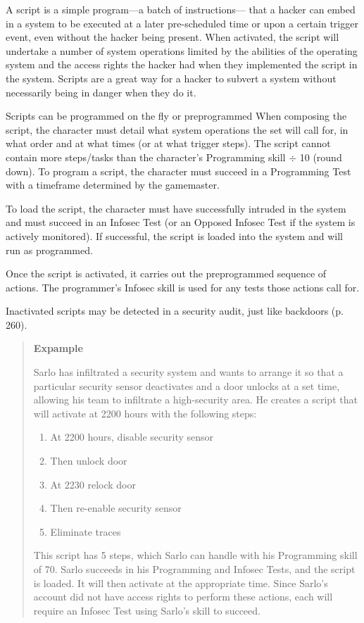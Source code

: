 A script is a simple program—a batch of instructions—
that a hacker can embed in a system to be executed at 
a later pre-scheduled time or upon a certain trigger 
event, even without the hacker being present. When 
activated, the script will undertake a number of system 
operations limited by the abilities of the operating 
system and the access rights the hacker had when 
they implemented the script in the system. Scripts are 
a great way for a hacker to subvert a system without 
necessarily being in danger when they do it.

Scripts can be programmed on the fly or preprogrammed
When composing the script, the character
must detail what system operations the set will call 
for, in what order and at what times (or at what trigger
steps). The script cannot contain more steps/tasks
than the character's Programming skill $\div$ 10 (round 
down). To program a script, the character must succeed
in a Programming Test with a timeframe determined
by the gamemaster.

To load the script, the character must have successfully
intruded in the system and must succeed
in an Infosec Test (or an Opposed Infosec Test if the 
system is actively monitored). If successful, the script 
is loaded into the system and will run as programmed.

Once the script is activated, it carries out the preprogrammed
sequence of actions. The programmer's
Infosec skill is used for any tests those actions call for.

Inactivated scripts may be detected in a security 
audit, just like backdoors (p. 260).

\begin{quotation}
\textbf{Expample}

Sarlo has infiltrated a security system and wants
to arrange it so that a particular security sensor
deactivates and a door unlocks at a set time, allowing
his team to infiltrate a high-security area.
He creates a script that will activate at 2200 hours
with the following steps:
\begin{enumerate}
\item At 2200 hours, disable security sensor
\item Then unlock door 
\item At 2230 relock door
\item Then re-enable security sensor
\item Eliminate traces
\end{enumerate}

This script has 5 steps, which Sarlo can handle
with his Programming skill of 70. Sarlo succeeds in
his Programming and Infosec Tests, and the script
is loaded. It will then activate at the appropriate
time. Since Sarlo’s account did not have access
rights to perform these actions, each will require
an Infosec Test using Sarlo’s skill to succeed.

\end{quotation}


